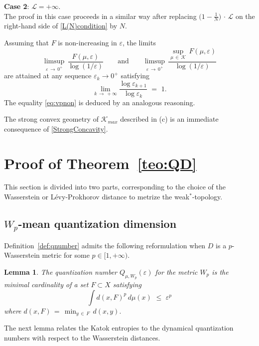 \documentclass[11pt,a4paper,reqno]{amsart}
\theoremstyle{plain}
\newtheorem{lemma}[theorem]{Lemma}
\theoremstyle{definition}
\newcommand{\ep} {\varepsilon}
\newcommand{\vep}{\varepsilon}
\newcommand{\cK}{{\mathcal K}}
\begin{document}
\smallskip

\noindent \textbf{Case 2}: $\mathcal{L} = +\infty$. \\

The proof in this case proceeds in a similar way after replacing $\big(1-\frac{1}{N}\big)\,\cdot\,\mathcal{L}$ on the right-hand side of \eqref{L(N)condition} by $N$.
\smallskip

Assuming that $F$ is non-increasing in $\vep$, the limits
$$\limsup_{\ep\,\to\,0^+}\,
\frac{F(\mu,\ep)}{\log(1/\ep)}\qquad\text{and}\qquad\limsup_{\ep\,\to\,0^+}\,
\frac{\sup_{\mu\,\in\,\cK}\,F(\mu,\ep)}{\log(1/\ep)}$$ are attained at any sequence $\ep_k\rightarrow 0^+$ satisfying $$\lim_{k\,\to\,+\infty}\frac{\log \ep_{k+1}}{\log \ep_{k}}\,\,=\,\,1.$$
The equality \eqref{eq:vpnon} is deduced by an analogous reasoning. 
\smallskip

The strong convex geometry of $\cK_{max}$ described in (c) is an immediate consequence of \eqref{StrongConcavity}.


\section{Proof of Theorem~\ref{teo:QD}}\label{se:MQD}

This section is divided into two parts, corresponding to the choice of the Wasserstein or L\'evy-Prokhorov distance to metrize the weak$^*$-topology. 

\subsection{$W_p$-mean quantization dimension}\label{se:QW}

Definition~\ref{def:qnumber} admits the following reformulation when $D$ is a $p$-Wasserstein metric for some $p \in [1, +\infty)$.

\begin{lemma}\cite[Proposition 3.2]{BB} The quantization number $Q_{\mu,W_p}(\ep)$ for the metric $W_p$ is the minimal cardinality of a set $F\subset X$ satisfying 
$$\int   d(x,F)^p\, d\mu(x)\,\,\leq\,\,\ep^p$$
where $d(x,F)\,=\,\min_{y\,\in\,F}\,d(x,y).$
\end{lemma}


The next lemma relates the Katok entropies to the dynamical quantization numbers with respect to the Wasserstein distances.
\end{document}
